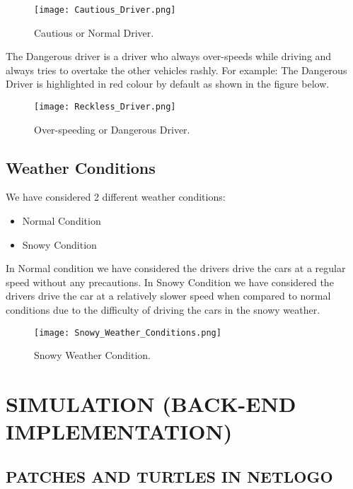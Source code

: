 \documentclass[11pt,a4paper]{article}
\begin{document}
\begin{figure}[!ht]
\centering
\texttt{[image: Cautious\_Driver.png]}
\caption{\label{fig:cd}Cautious or Normal Driver.}
\end{figure}

The Dangerous driver is a driver who always over-speeds while driving and always tries to overtake the other vehicles rashly. For example: The Dangerous Driver is highlighted in red colour by default as shown in the figure below.

\begin{figure}[!ht]
\centering
\texttt{[image: Reckless\_Driver.png]}
\caption{\label{fig:rd}Over-speeding or Dangerous Driver.}
\end{figure}

\subsection{\textbf{Weather Conditions}}

We have considered 2 different weather conditions:
\begin{itemize}
\item Normal Condition
\item Snowy Condition
\end{itemize}
In Normal condition we have considered the drivers drive the cars at a regular speed without any precautions.\newline 
In Snowy Condition we have considered the drivers drive the car at a relatively slower speed when compared to normal conditions due to the difficulty of driving the cars in the snowy weather.

\begin{figure}[!ht]
\centering
\texttt{[image: Snowy\_Weather\_Conditions.png]}
\caption{\label{fig:swc}Snowy Weather Condition.}
\end{figure}

                                    
\section{SIMULATION (BACK-END IMPLEMENTATION)}


\subsection{PATCHES AND TURTLES IN NETLOGO}
\end{document}

